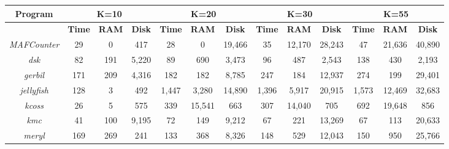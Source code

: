\documentclass{article}
\begin{document}
\noindent
\setlength{\tabcolsep}{1pt}
\scriptsize
\begin{adjustbox}{max width=\textwidth, max totalheight=\textheight, keepaspectratio}
\begin{tabular}{@{}|c|c|c|c|c|c|c|c|c|c|c|c|c|}
\hline
\textbf{Program} & \multicolumn{3}{c|}{\textbf{K=10}} & \multicolumn{3}{c|}{\textbf{K=20}} & \multicolumn{3}{c|}{\textbf{K=30}} & \multicolumn{3}{c|}{\textbf{K=55}} \\
\hline
 & \textbf{\hspace{2pt}Time\hspace{2pt}} & \textbf{\hspace{2pt}RAM\hspace{2pt}} & \textbf{\hspace{2pt}Disk\hspace{2pt}} & \textbf{\hspace{2pt}Time\hspace{2pt}} & \textbf{\hspace{2pt}RAM\hspace{2pt}} & \textbf{\hspace{2pt}Disk\hspace{2pt}} & \textbf{\hspace{2pt}Time\hspace{2pt}} & \textbf{\hspace{2pt}RAM\hspace{2pt}} & \textbf{\hspace{2pt}Disk\hspace{2pt}} & \textbf{\hspace{2pt}Time\hspace{2pt}} & \textbf{\hspace{2pt}RAM\hspace{2pt}} & \textbf{\hspace{2pt}Disk\hspace{2pt}} \\
\hline
\textit{MAFCounter} & 29 & 0 & 417 & 28 & 0 & 19,466 & 35 & 12,170 & 28,243 & 47 & 21,636 & 40,890 \\
\hline
\textit{dsk} & 82 & 191 & 5,220 & 89 & 690 & 3,473 & 96 & 487 & 2,543 & 138 & 430 & 2,193 \\
\hline
\textit{gerbil} & 171 & 209 & 4,316 & 182 & 182 & 8,785 & 247 & 184 & 12,937 & 274 & 199 & 29,401 \\
\hline
\textit{jellyfish} & 128 & 3 & 492 & 1,447 & 3,280 & 14,890 & 1,396 & 5,917 & 20,915 & 1,573 & 12,469 & 32,683 \\
\hline
\textit{kcoss} & 26 & 5 & 575 & 339 & 15,541 & 663 & 307 & 14,040 & 705 & 692 & 19,648 & 856 \\
\hline
\textit{kmc} & 41 & 100 & 9,195 & 72 & 149 & 9,212 & 67 & 221 & 13,269 & 67 & 113 & 20,633 \\
\hline
\textit{meryl} & 169 & 269 & 241 & 133 & 368 & 8,326 & 148 & 529 & 12,043 & 150 & 950 & 25,766 \\
\hline
\end{tabular}
\end{adjustbox}
\end{document}
